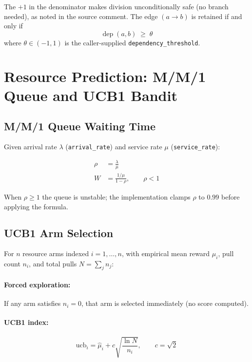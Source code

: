 \documentclass[11pt,a4paper]{article}
\begin{document}
The $+1$ in the denominator makes division unconditionally safe (no branch
needed), as noted in the source comment. The edge $(a \to b)$ is retained if
and only if
\begin{equation}
  \operatorname{dep}(a,b) \;\geq\; \theta
\end{equation}
where $\theta \in (-1, 1)$ is the caller-supplied \texttt{dependency\_threshold}.

\section{Resource Prediction: M/M/1 Queue and UCB1 Bandit}

\subsection{M/M/1 Queue Waiting Time}

Given arrival rate $\lambda$ (\texttt{arrival\_rate}) and service rate $\mu$
(\texttt{service\_rate}):

\begin{align}
  \rho &= \frac{\lambda}{\mu} \tag{utilization} \\[6pt]
  W    &= \frac{1/\mu}{1 - \rho}, \qquad \rho < 1 \tag{mean waiting time}
\end{align}

When $\rho \geq 1$ the queue is unstable; the implementation clamps $\rho$ to
$0.99$ before applying the formula.

\subsection{UCB1 Arm Selection}

For $n$ resource arms indexed $i = 1,\ldots,n$, with empirical mean reward
$\hat{\mu}_i$, pull count $n_i$, and total pulls $N = \sum_j n_j$:

\paragraph{Forced exploration:}
If any arm satisfies $n_i = 0$, that arm is selected immediately (no score
computed).

\paragraph{UCB1 index:}
\begin{equation}
  \text{ucb}_i = \hat{\mu}_i + c \sqrt{\frac{\ln N}{n_i}}, \qquad c = \sqrt{2}
\end{equation}
\end{document}

